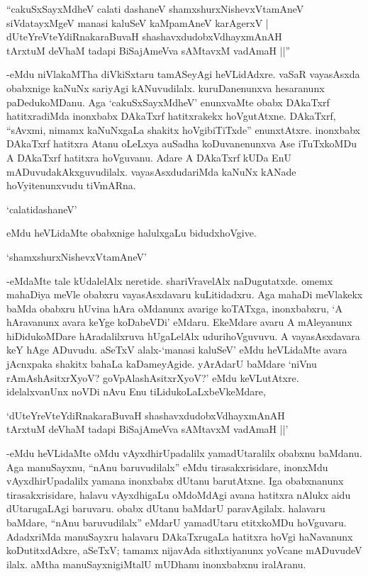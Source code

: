 \begin{shloka}
``cakuSxSayxMdheV calati dashaneV shamxshurxNishevxVtamAneV\\
siVdatayxMgeV manasi kaluSeV kaMpamAneV karAgerxV |\\
dUteYreVteYdiRnakaraBuvaH shashavxdudobxVdhayxmAnAH\\
tArxtuM deVhaM tadapi BiSajAmeVva sAMtavxM vadAmaH ||''
\end{shloka}

-eMdu niVlakaMTha diVkiSxtaru tamASeyAgi heVLidAdxre. {}vaSaR vayasAsxda obabxnige kaNuNx sariyAgi kANuvudilalx. kuruDanenunxva hesaranunx paDedukoMDanu. Aga `cakuSxSayxMdheV' enunxvaMte obabx DAkaTxrf hatitxradiMda inonxbabx DAkaTxrf hatitxrakekx hoVgutAtxne. DAkaTxrf, ``sAvxmi, nimamx kaNuNxgaLa shakitx hoVgibiTiTxde'' enunxtAtxre. inonxbabx DAkaTxrf hatitxra Atanu oLeLxya auSadha koDuvanenunxva Ase iTuTxkoMDu A DAkaTxrf hatitxra hoVguvanu. Adare A DAkaTxrf kUDa EnU mADuvudakAkxguvudilalx. vayasAsxdudariMda kaNuNx kANade hoVyitenunxvudu tiVmARna.

`calatidashaneV'

eMdu heVLidaMte obabxnige halulxgaLu bidudxhoVgive.

\begin{shloka}
`shamxshurxNishevxVtamAneV'
\end{shloka}

-eMdaMte tale kUdalelAlx neretide. shariVravelAlx naDugutatxde. omemx mahaDiya meVle obabxru vayasAsxdavaru kuLitidadxru. Aga mahaDi meVlakekx baMda obabxru hUvina hAra oMdanunx avarige koTATxga, inonxbabxru, `A hAravanunx avara keYge koDabeVDi' eMdaru. EkeMdare avaru A mAleyanunx hiDidukoMDare hAradalilxruva hUgaLelAlx udurihoVguvuvu. A vayasAsxdavara keY hAge ADuvudu. aSeTxV alalx-`manasi kaluSeV' eMdu heVLidaMte avara jAcnxpaka shakitx bahaLa kaDameyAgide. yArAdarU baMdare `niVnu rAmAshAsitxrXyoV? goVpAlashAsitxrXyoV?' eMdu keVLutAtxre. idelalxvanUnx noVDi nAvu Enu tiLidukoLaLxbeVkeMdare,

\begin{shloka}
`dUteYreVteYdiRnakaraBuvaH shashavxdudobxVdhayxmAnAH\\
tArxtuM deVhaM tadapi BiSajAmeVva sAMtavxM vadAmaH ||'
\end{shloka}

-eMdu heVLidaMte oMdu vAyxdhirUpadalilx yamadUtaralilx obabxnu baMdanu. Aga manuSayxnu, ``nAnu baruvudilalx'' eMdu tirasakxrisidare, inonxMdu vAyxdhirUpadalilx yamana inonxbabx dUtanu barutAtxne. Iga obabxnanunx tirasakxrisidare, halavu vAyxdhigaLu oMdoMdAgi avana hatitxra nAlukx aidu dUtarugaLAgi baruvaru. obabx dUtanu baMdarU paravAgilalx. halavaru baMdare, ``nAnu baruvudilalx'' eMdarU yamadUtaru etitxkoMDu hoVguvaru. AdadxriMda manuSayxru halavaru DAkaTxrugaLa hatitxra hoVgi haNavanunx koDutitxdAdxre, aSeTxV; tamamx nijavAda sithxtiyanunx yoVcane mADuvudeV ilalx. aMtha manuSayxnigiMtalU mUDhanu inonxbabxnu iralAranu.

